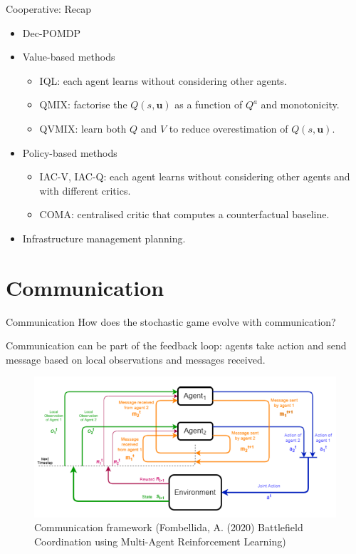 \documentclass[9pt, hyperref={pdfusetitle,colorlinks=true,allcolors=DarkBlue}]{beamer}
\begin{document}
\begin{frame}{Cooperative: Recap}
\begin{itemize}
    \item Dec-POMDP
    \vfill
    \item Value-based methods
        \begin{itemize}
        \item IQL: each agent learns without considering other agents.
        \item QMIX: factorise the $Q(s,\bm{u})$ as a function of $Q^a$ and monotonicity.
        \item QVMIX: learn both $Q$ and $V$ to reduce overestimation of $Q(s,\bm{u})$.
        \end{itemize}{}
    \vfill
    \item Policy-based methods
        \begin{itemize}
        \item IAC-V, IAC-Q: each agent learns without considering other agents and with different critics.
        \item COMA: centralised critic that computes a counterfactual baseline.
        \end{itemize}{}
    \vfill
    \item Infrastructure management planning.
\end{itemize}{}
\end{frame}

\section{Communication}
\begin{frame}{Communication}
How does the stochastic game evolve with communication?

Communication can be part of the feedback loop: agents take action and send message based on local observations and messages received. 

\begin{figure}
    \centering
    \includegraphics[scale=0.45]{com_scheme_1.png}
    \caption{Communication framework (Fombellida, A. (2020) Battlefield Coordination using Multi-Agent Reinforcement Learning)}
\end{figure}
\end{frame}
\end{document}
